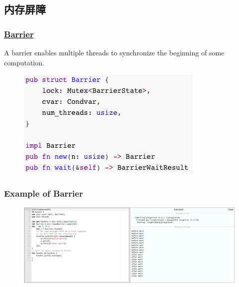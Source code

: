 \subsection{内存屏障} %
\begin{frame}[fragile]
    \frametitle{\href{https://doc.rust-lang.org/std/sync/struct.Barrier.html}{Barrier}}

A barrier enables multiple threads to synchronize the beginning of some computation. \pause

    \begin{figure}
    \includegraphics[width=0.6\linewidth]{figs/struct-barrier.png}
    \end{figure}

\end{frame}
% 
% 
% 
% 
% 
% 
\begin{frame}[fragile]
    \frametitle{Example of Barrier}
    \begin{figure}
    \includegraphics[width=1.0\linewidth]{figs/demo-barrier.png}
    \end{figure}

\end{frame}
% 
% 
% 
% 
% 
% 
